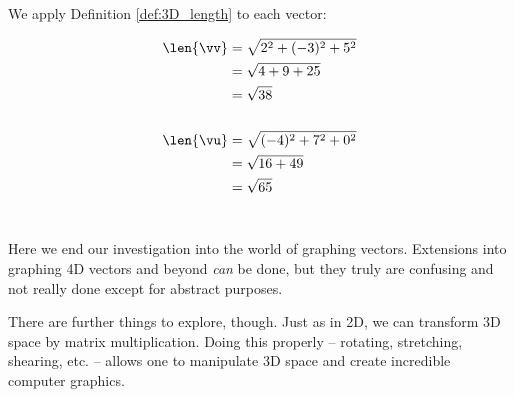 \medskip

{We apply Definition \ref{def:3D_length} to each vector:

\begin{align*}
\len{\vv} 	&= \sqrt{2^2 + (-3)^2 + 5^2} \\
					&= \sqrt{4 + 9 + 25}\\
					&= \sqrt{38}\\
\\
\len{\vu} &= \sqrt{(-4)^2 + 7^2 + 0^2}\\
				&= \sqrt{16+49}\\
				&= \sqrt{65}
\end{align*}
\ } 

\medskip

Here we end our investigation into the world of graphing vectors. Extensions into graphing 4D vectors and beyond \textit{can} be done, but they truly are confusing and not really done except for abstract purposes. 

There are further things to explore, though. Just as in 2D, we can transform 3D space by matrix multiplication. Doing this properly -- rotating, stretching, shearing, etc. -- allows one to manipulate 3D space and create incredible computer graphics. \\



